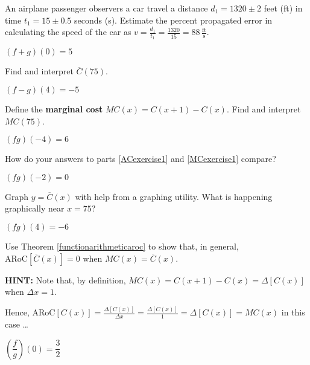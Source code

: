 \documentclass{ximera}
\begin{document}
\begin{question}
An airplane passenger  observers a car travel a distance $d_{1} = 1320 \pm 2$ feet (ft) in time $t_{1}  = 15 \pm 0.5$ seconds (s).  Estimate the percent propagated error in calculating the speed of the car as $v = \frac{d_{1}}{t_{1}} = \frac{1320}{15} = 88 \, \frac{\text{ft}}{\text{s}}$.
\begin{solution}
$(f + g)(0) = 5$
\end{solution}

\end{question}

\begin{question}
Find and interpret $\overline{C}(75)$.
\begin{solution}
$(f-g)(4) = -5$

\end{solution}

\end{question}

\begin{question}
Define  the \textbf{marginal cost} $MC(x) = C(x+1) - C(x)$.   Find and interpret $MC(75)$.
\begin{solution}
$(fg)(-4) = 6$
\end{solution}

\end{question}

\begin{question}
How do your answers to parts \ref{ACexercise1} and \ref{MCexercise1} compare?
\begin{solution}
$(fg)(-2) = 0$
\end{solution}

\end{question}

\begin{question}
Graph $y = \overline{C}(x)$ with help from a graphing utility.  What is happening graphically near $x = 75$?
\begin{solution}
$(fg)(4) = -6$

\end{solution}

\end{question}

\begin{question}
Use Theorem \ref{functionarithmeticaroc} to show that, in general, $\text{ARoC}[ \overline{C}(x)] = 0$ when $MC(x) = \overline{C}(x)$.

\smallskip

\textbf{HINT:}  Note that, by definition, $MC(x) = C(x+1) - C(x) = \Delta[C(x)]$ when $\Delta x = 1$.  

\smallskip

Hence,  $\text{ARoC}[C(x)] = \frac{\Delta[C(x)]}{\Delta x} = \frac{\Delta[C(x)]}{1} = \Delta[C(x)] = MC(x)$ in this case \ldots
\begin{solution}
$\left(\dfrac{f}{g}\right)(0) = \dfrac{3}{2}$
\end{solution}

\end{question}
\end{document}
